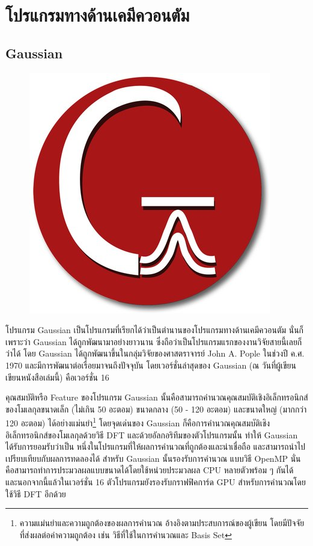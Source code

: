 

\chapter{โปรแกรมทางด้านเคมีควอนตัม}
\label{ch:qm_software}

\section{Gaussian}
\label{sec:software_gaussian}

\begin{figure}[H]
    \centering
    \includegraphics[width=0.25\linewidth]{fig/logo_gaussian.jpg}
    \label{fig:logo_gaussian}
\end{figure}

โปรแกรม Gaussian เป็นโปรแกรมที่เรียกได้ว่าเป็นตำนานของโปรแกรมทางด้านเคมีควอนตัม นั่นก็เพราะว่า Gaussian ได้ถูกพัฒนามาอย่างยาวนาน 
ซึ่งถือว่าเป็นโปรแกรมแรกของงานวิจัยสายนี้เลยก็ว่าได้ โดย Gaussian ได้ถูกพัฒนาขึ้นในกลุ่มวิจัยของศาสตราจารย์ John A. Pople ในช่วงปี ค.ศ.
1970 และมีการพัฒนาต่อเรื่อยมาจนถึงปัจจุบัน โดยเวอร์ชั่นล่าสุดของ Gaussian (ณ วันที่ผู้เขียนเขียนหนังสือเล่มนี้) คือเวอร์ชั่น 16\autocite{g16}

คุณสมบัติหรือ Feature ของโปรแกรม Gaussian นั้นคือสามารถคำนวณคุณสมบัติเชิงอิเล็กทรอนิกส์ของโมเลกุลขนาดเล็ก (ไม่เกิน 50 อะตอม) 
ขนาดกลาง (50 - 120 อะตอม) และขนาดใหญ่ (มากกว่า 120 อะตอม) ได้อย่างแม่นยำ\footnote{ความแม่นยำและความถูกต้องของผลการคำนวณ%
อ้างอิงตามประสบการณ์ของผู้เขียน โดยมีปัจจัยที่ส่งผลต่อค่าความถูกต้อง เช่น วิธีที่ใช้ในการคำนวณและ Basis Set} โดยจุดเด่นของ Gaussian 
ก็คือการคำนวณคุณสมบัติเชิงอิเล็กทรอนิกส์ของโมเลกุลด้วยวิธี DFT และด้วยอัลกอริทึมของตัวโปรแกรมนั้น ทำให้ Gaussian ได้รับการยอมรับว่าเป็น%
หนึ่งในโปรแกรมที่ให้ผลการคำนวณที่ถูกต้องและน่าเชื่อถือ และสามารถนำไปเปรียบเทียบกับผลการทดลองได้ สำหรับ Gaussian นั้นรองรับการคำนวณ%
แบบวิธี OpenMP นั่นคือสามารถทำการประมวลผลแบบขนาดได้โดยใช้หน่วยประมวลผล CPU หลายตัวพร้อม ๆ กันได้ และนอกจากนี้แล้วในเวอร์ชั่น 16
ตัวโปรแกรมยังรองรับกราฟฟิคการ์ด GPU สำหรับการคำนวณโดยใช้วิธี DFT อีกด้วย 

